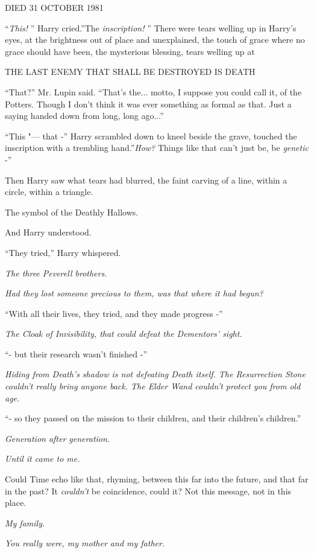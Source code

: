 DIED 31 OCTOBER 1981

``\emph{This!} '' Harry cried.''The \emph{inscription!} '' There were tears
welling up in Harry's eyes, at the brightness out of place and
unexplained, the touch of grace where no grace should have been, the
mysterious blessing, tears welling up at

THE LAST ENEMY THAT SHALL BE DESTROYED IS DEATH

``That?'' Mr. Lupin said. ``That's the... motto, I suppose you
could call it, of the Potters. Though I don't think it was ever
something as formal as that. Just a saying handed down from long, long
ago...''

``This "--- that -'' Harry scrambled down to kneel beside the grave,
touched the inscription with a trembling hand.''\emph{How?} Things like
that can't just be, be \emph{genetic} -''

Then Harry saw what tears had blurred, the faint carving of a line,
within a circle, within a triangle.

The symbol of the Deathly Hallows.

And Harry understood.

``They tried,'' Harry whispered.

\emph{The three Peverell brothers.}

\emph{Had they lost someone precious to them, was that where it had
begun?}

``With all their lives, they tried, and they made progress -''

\emph{The Cloak of Invisibility, that could defeat the Dementors'
sight.}

``- but their research wasn't finished -''

\emph{Hiding from Death's shadow is not defeating Death itself. The
Resurrection Stone couldn't really bring anyone back. The Elder Wand
couldn't protect you from old age.}

``- so they passed on the mission to their children, and their
children's children.''

\emph{Generation after generation.}

\emph{Until it came to me.}

Could Time echo like that, rhyming, between this far into the future,
and that far in the past? It \emph{couldn't} be coincidence, could it?
Not this message, not in this place.

\emph{My family.}

\emph{You really were, my mother and my father.}

